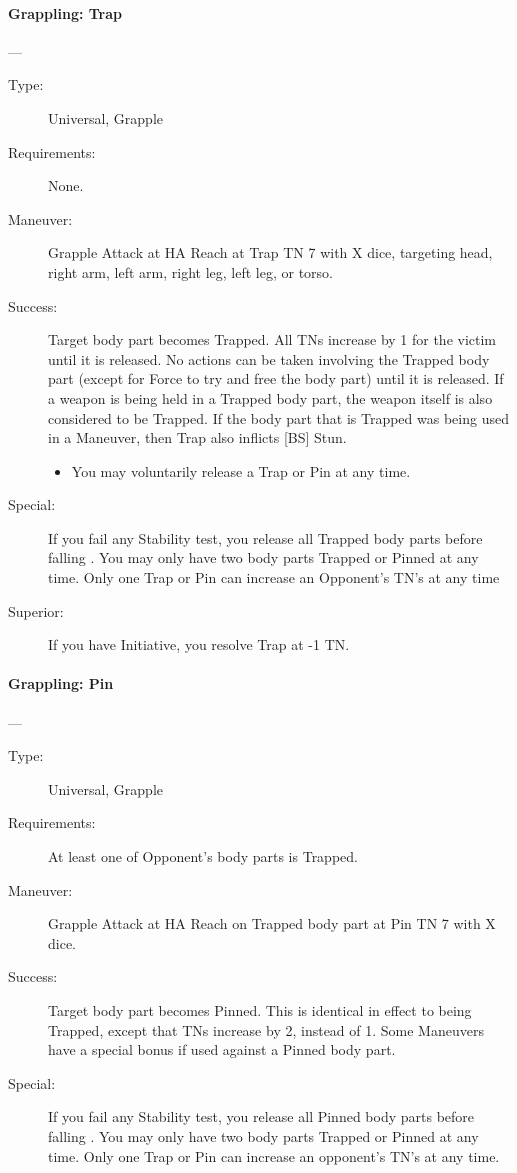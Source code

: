 \paragraph{ Grappling: Trap \large } \label{man:grappling-trap}
---\quad {\large [X]}
\vspace{-10pt} \begin{description}
\item [Type:] Universal, Grapple
\item [Requirements:] None.
\item [Maneuver:] Grapple Attack at HA Reach at Trap TN 7 with X dice, targeting
  head, right arm, left arm, right leg, left leg, or torso.

\item [Success:] Target body part becomes Trapped. All TNs increase by 1 for the
  victim until it is released. No actions can be taken involving the Trapped
  body part (except for Force to try and free the body part) until it is
  released. If a weapon is being held in a Trapped body part, the weapon itself
  is also considered to be Trapped. If the body part that is Trapped was being
  used in a Maneuver, then Trap also inflicts [BS] Stun.
\begin{itemize}
\item You may voluntarily release a Trap or Pin at any time.
\end{itemize}
\item [Special:] If you fail any Stability test, you release all Trapped body
  parts before falling . You may only have two body parts Trapped or Pinned
  at any time. Only one Trap or Pin can increase an Opponent’s TN’s at any time

\item [ Superior: ] If you have Initiative, you resolve Trap at -1 TN.
\end{description}

\paragraph{Grappling: Pin \large } \label{man:grappling-pin}
---\quad {\large [X+2]}
\vspace{-10pt} \begin{description}
\item [Type:] Universal, Grapple
\item [Requirements:] At least one of Opponent's body parts is Trapped.
\item [Maneuver:] Grapple Attack at HA Reach on Trapped body part at Pin TN 7 with X dice.
\item [Success:] Target body part becomes Pinned. This is identical in effect to
  being Trapped, except that TNs increase by 2, instead of 1. Some Maneuvers
  have a special bonus if used against a Pinned body part.  
\item [Special:] If you fail any Stability test, you release all Pinned body
  parts before falling . You may only have two body parts
  Trapped or Pinned at any time. Only one Trap or Pin can increase an opponent’s
  TN’s at any time.  
\end{description}

